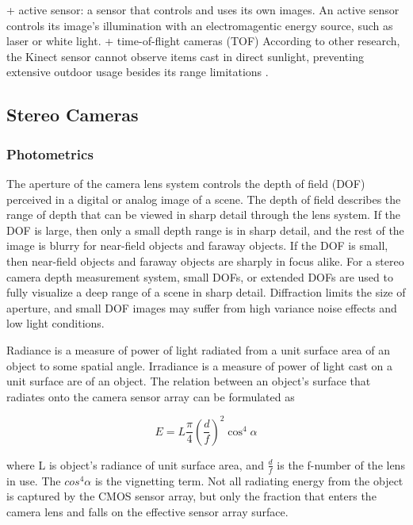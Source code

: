\documentclass[12pt,a4paper,oneside,pdftex]{report}
\begin{document}
+ active sensor: a sensor that controls and uses its own images. An active sensor controls its image's illumination with an electromagentic energy source, such as laser or white light.
+ time-of-flight cameras (TOF)
According to other research, the Kinect sensor cannot observe items cast in direct sunlight, preventing extensive outdoor usage besides its range limitations \cite{tikkanen13}.  

\subsection{Stereo Cameras}
\label{subsection:stereo_cameras}

\subsubsection{Photometrics}
\label{subsubsection:photometrics}

The aperture of the camera lens system controls the depth of field (DOF) perceived in a digital or analog image of a scene. The depth of field describes the range of depth that can be viewed in sharp detail through the lens system. If the DOF is large, then only a small depth range is in sharp detail, and the rest of the image is blurry for near-field objects and faraway objects. If the DOF is small, then near-field objects and faraway objects are sharply in focus alike. For a stereo camera depth measurement system, small DOFs, or extended DOFs are used to fully visualize a deep range of a scene in sharp detail. Diffraction limits the size of aperture, and small DOF images may suffer from high variance noise effects and low light conditions.

Radiance is a measure of power of light radiated from a unit surface area of an object to some spatial angle. 
Irradiance is a measure of power of light cast on a unit surface are of an object.
The relation between an object's surface that radiates onto the camera sensor array can be formulated as

\begin{equation}
\label{equation:radiance}
E = L \frac{\pi}{4} (\frac{d}{f})^2 \cos^4{\alpha}
\end{equation}

where L is object's radiance of unit surface area, and $\frac{d}{f}$ is the f-number of the lens in use. The $cos^4{\alpha}$ is the vignetting term. Not all radiating energy from the object is captured by the CMOS sensor array, but only the fraction that enters the camera lens and falls on the effective sensor array surface.
\end{document}
